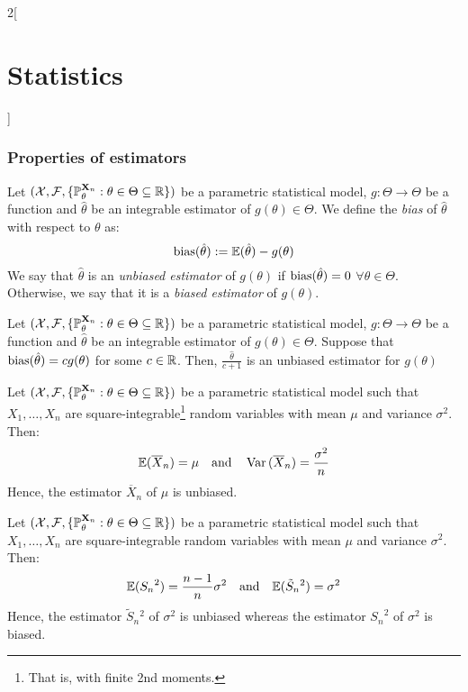 \documentclass[../../../main.tex]{subfiles}
\begin{document}
\begin{multicols}{2}[\section{Statistics}]
  \subsubsection{Properties of estimators}
  \begin{definition}[Bias]
    Let $(\mathcal{X},\mathcal{F},\{\mathbb{P}_{\theta}^{\boldsymbol{\mathrm{X}}_n}:{\theta}\in\Theta\subseteq \mathbb{R}\})$ be a parametric statistical model, $g:\Theta\rightarrow\Theta$ be a function and ${\hat\theta}$ be an integrable estimator of $g({\theta})\in\Theta$. We define the \emph{bias} of ${\hat\theta}$ with respect to ${\theta}$ as: $$\operatorname{bias}({\hat\theta}):=\mathbb{E}({\hat\theta})-g({\theta})$$ We say that ${\hat\theta}$ is an \emph{unbiased estimator} of $g({\theta})$ if $\operatorname{bias}({\hat\theta})=0$ $\forall\theta\in\Theta$. Otherwise, we say that it is a \emph{biased estimator} of $g({\theta})$.
  \end{definition}
  \begin{proposition}
    Let $(\mathcal{X},\mathcal{F},\{\mathbb{P}_{\theta}^{\boldsymbol{\mathrm{X}}_n}:{\theta}\in\Theta\subseteq \mathbb{R}\})$ be a parametric statistical model, $g:\Theta\rightarrow\Theta$ be a function and ${\hat\theta}$ be an integrable estimator of $g({\theta})\in\Theta$. Suppose that $\operatorname{bias}(\hat\theta)=cg(\theta)$ for some $c\in\mathbb{R}$. Then, $\frac{\hat\theta}{c+1}$ is an unbiased estimator for $g(\theta)$
  \end{proposition}
  \begin{proposition}
    Let $(\mathcal{X},\mathcal{F},\{\mathbb{P}_{\theta}^{\boldsymbol{\mathrm{X}}_n}:{\theta}\in\Theta\subseteq \mathbb{R}\})$ be a parametric statistical model such that $X_1,\ldots,X_n$ are square-integrable\footnote{That is, with finite 2nd moments.} \iid random variables with mean $\mu$ and variance $\sigma^2$. Then: $$\mathbb{E}(\overline{X}_n)=\mu\quad\text{and}\quad\operatorname{Var}{(\overline{X}_n)}=\frac{\sigma^2}{n}$$
    Hence, the estimator $\overline{X}_n$ of $\mu$ is unbiased.
  \end{proposition}
  \begin{proposition}
    Let $(\mathcal{X},\mathcal{F},\{\mathbb{P}_{\theta}^{\boldsymbol{\mathrm{X}}_n}:{\theta}\in\Theta\subseteq \mathbb{R}\})$ be a parametric statistical model such that $X_1,\ldots,X_n$ are square-integrable \iid random variables with mean $\mu$ and variance $\sigma^2$. Then: $$\mathbb{E}({S_n}^2)=\frac{n-1}{n}\sigma^2\quad\text{and}\quad\mathbb{E}(\tilde{S}_n{}^2)=\sigma^2$$
    Hence, the estimator $\tilde{S}_n{}^2$ of $\sigma^2$ is unbiased whereas the estimator ${S_n}^2$ of $\sigma^2$ is biased.
  \end{proposition}
  \begin{definition}

\end{definition}
\end{multicols}
\end{document}
